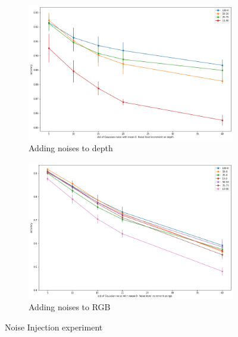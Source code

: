 \begin{figure}[h]
	\centering
	\begin{subfigure}{0.49\textwidth}
		\centering
		\includegraphics[width=\textwidth]{img/noise_injection_depth}
		\caption{Adding noises to depth}
	\end{subfigure}
	\begin{subfigure}{0.49\textwidth}
		\centering
		\includegraphics[width=\textwidth]{img/noise_injection_rgb}
		\caption{Adding noises to RGB}
	\end{subfigure}
	\caption{Noise Injection experiment}
	\label{fig:noise_injection}
\end{figure}

